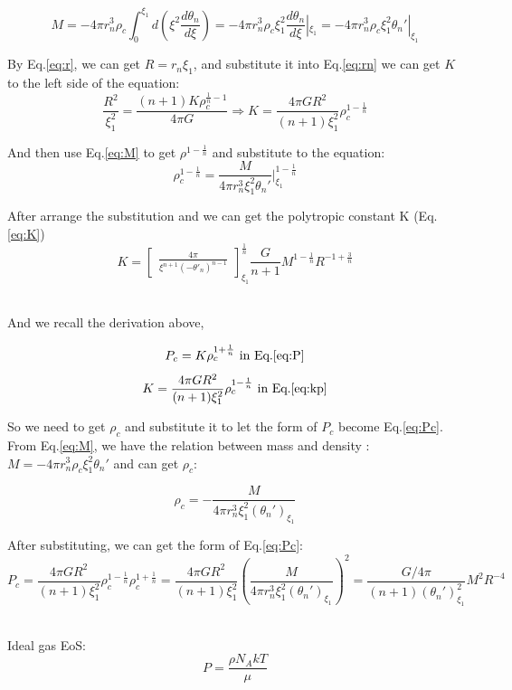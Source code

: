 \documentclass{article}
\begin{document}
\begin{equation}
M=-4\pi r_n^3\rho_c\int_{0}^{\xi_1}d(\xi^2 \frac{d\theta_n}{d\xi})
=-4\pi r_n^3\rho_c\xi_1^2 \frac{d\theta_n}{d\xi}|_{\xi_1}
=-4\pi r_n^3\rho_c\xi_1^2 \theta_n'|_{\xi_1}
    \label{eq:M}
\end{equation}

By Eq.\ref{eq:r}, we can get $R=r_n\xi_1$, and substitute it into Eq.\ref{eq:rn} we can get $K$ to the left side of the equation:
\begin{equation}
    \frac{R^2}{\xi_1^2}=\frac{(n+1)K \rho_c^{\frac{1}{n}-1}}{4\pi G}
    \Rightarrow K=\frac{4\pi G R^2}{(n+1)\xi_1^2}\rho_c^{1-\frac{1}{n}}
    \label{eq:kp}
\end{equation}



And then use Eq.\ref{eq:M} to get $\rho^{1-\frac{1}{n}}$ and substitute to the equation:
$$
\rho_c^{1-\frac{1}{n}}=\frac{M}{4\pi r_n^3 \xi_1^2 \theta_n'}|_{\xi_1}^{1-\frac{1}{n}}
$$

After arrange the substitution and we can get the polytropic constant K (Eq.\ref{eq:K})
$$
K=\begin{bmatrix}
        \frac{4\pi}{\xi^{n+1}(-\theta'_n)^{n-1}}
        \end{bmatrix}_{\xi_1}^{\frac{1}{n}}
      \frac{G}{n+1}M^{1-\frac{1}{n}}R^{-1+\frac{3}{n}}
$$

\hrulefill %
\\
And we recall the derivation above,

$$P_c=K \rho_c ^{1+\frac{1}{n}} \mbox{ in Eq.\ref{eq:P}}$$
$$K= \frac{4\pi G R^2}{(n+1)\xi_1^2}\rho_c^{1-\frac{1}{n}} \mbox{ in Eq.\ref{eq:kp}}$$

So we need to get $\rho_c$ and substitute it to let the form of $P_c$ become Eq.\ref{eq:Pc}.
From Eq.\ref{eq:M}, we have the relation between mass and density : $M=-4\pi r_n^3\rho_c\xi_1^2\theta_n'$ and can get $\rho_c$:

\begin{equation}
    \rho_c=-\frac{M}{4\pi r_n^3\xi_1^2(\theta_n')_{\xi_1}}
    \label{eq:rho}
\end{equation}

After substituting, we can get the form of Eq.\ref{eq:Pc}:
$$
    P_c=\frac{4\pi G R^2}{(n+1)\xi_1^2}\rho_c^{1-\frac{1}{n}}\rho_c^{1+\frac{1}{n}}
    =\frac{4\pi G R^2}{(n+1)\xi_1^2}(\frac{M}{4\pi r_n^3\xi_1^2(\theta_n')_{\xi_1}})^2
    =\frac{G/4\pi}{(n+1)(\theta_n')_{\xi_1}^2}M^2R^{-4}
$$

\hrulefill %
\\
Ideal gas EoS:
\begin{equation}
    P=\frac{\rho N_A k T}{\mu}
\end{equation}
\end{document}
